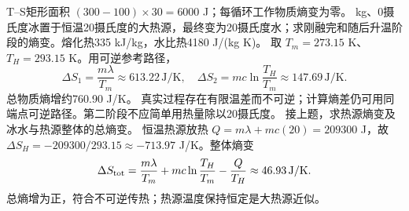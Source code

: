 \crosscheck T--S矩形面积 $(300-100)\times30=6000$ J；每循环工作物质熵变为零。
 kg、0摄氏度冰置于恒温20摄氏度的大热源，最终变为20摄氏度水；求刚融完和随后升温阶段的熵变。熔化热335 kJ/kg，水比热4180 J/(kg K)。
\workings 取 $T_m=273.15$ K、$T_H=293.15$ K。用可逆参考路径，
\[
\Delta S_1=\frac{m\lambda}{T_m}\approx613.22\,\mathrm{J/K},\quad
\Delta S_2=mc\ln\frac{T_H}{T_m}\approx147.69\,\mathrm{J/K}.
\]
总物质熵增约760.90 J/K。
\crosscheck 真实过程存在有限温差而不可逆；计算熵差仍可用同端点可逆路径。第二阶段不应简单用热量除以20摄氏度。
\problemtext 接上题，求热源熵变及冰水与热源整体的总熵变。
\workings 恒温热源放热 $Q=m\lambda+mc(20)=209300$ J，故 $\Delta S_H=-209300/293.15\approx-713.97$ J/K。整体熵变
\[
\Delta S_{\rm tot}=\frac{m\lambda}{T_m}+mc\ln\frac{T_H}{T_m}-\frac Q{T_H}\approx46.93\,\mathrm{J/K}.
\]
\crosscheck 总熵增为正，符合不可逆传热；热源温度保持恒定是大热源近似。
